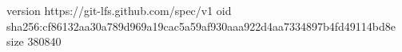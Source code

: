version https://git-lfs.github.com/spec/v1
oid sha256:cf86132aa30a789d969a19cac5a59af930aaa922d4aa7334897b4fd49114bd8e
size 380840
